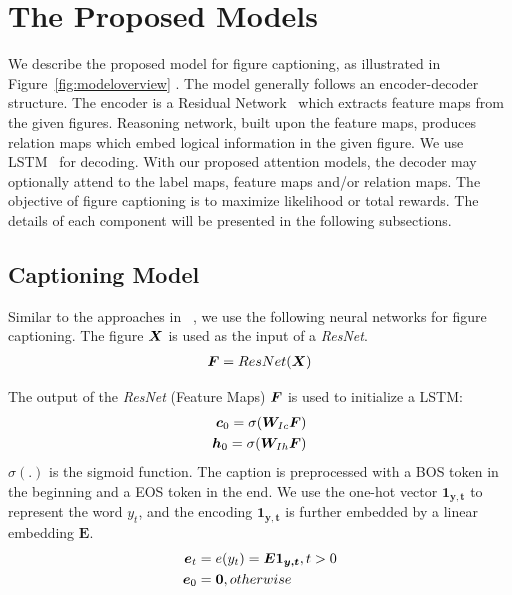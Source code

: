 \documentclass[11pt,a4paper]{article}
\begin{document}
\section{The Proposed Models}

We describe the proposed model for figure captioning, as illustrated in Figure~\ref{fig:modeloverview} . The model generally follows an encoder-decoder structure. The encoder is a Residual Network~\cite{he2016deep} which extracts feature maps from the given figures. Reasoning network, built upon the feature maps, produces relation maps which embed logical information in the given figure. We use LSTM~\cite{hochreiter1997long} for decoding. With our proposed attention models, the decoder may optionally attend to the label maps, feature maps and/or relation maps. The objective of figure captioning is to maximize likelihood or total rewards. The details of each component will be presented in the following subsections.


\subsection{Captioning Model}


Similar to the approaches in ~\cite{rennie2016self,karpathy2015deep}, we use the following neural networks for figure captioning. The figure ${\boldsymbol X}$ is used as the input of a \textit{ResNet}. 
\begin{align*}
{\boldsymbol F} = ResNet({{\boldsymbol X}})
\end{align*}

The output of the \textit{ResNet} (Feature Maps) ${\boldsymbol F}$ is used to initialize a LSTM: 
\begin{align*}
{\boldsymbol c}_{0} = \sigma({\boldsymbol W}_{Ic} {\boldsymbol F}) \\
{\boldsymbol h}_{0} = \sigma({\boldsymbol W}_{Ih} {\boldsymbol F})
\end{align*}
$\sigma(.)$ is the sigmoid function. The caption is preprocessed with a BOS token in the beginning and a EOS token in the end. We use the one-hot vector $\bm{1_{y,t}}$ to represent the word $y_t$, and the encoding $\bm{1_{y,t}}$ is further embedded by a linear embedding $\bm{E}$. 
\begin{align*}
{\boldsymbol e}_{t} & = e(y_t) = \bm{E 1_{y,t}}, t > 0\\
{\boldsymbol e}_{0} & = \bm{0}, otherwise
\end{align*}
\end{document}
